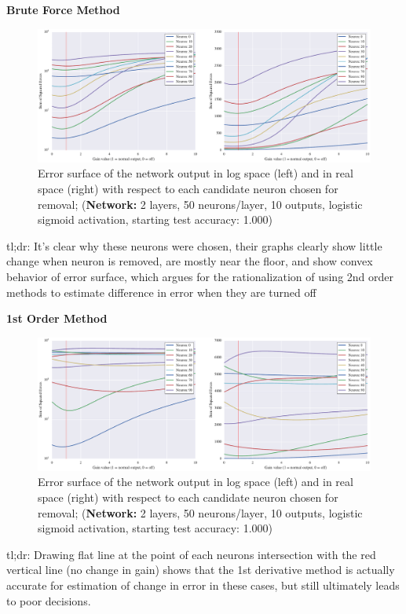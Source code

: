 \textbf{Brute Force Method}
\begin{figure}
\centering
\includegraphics[width=\linewidth]{png/mnist-deep-gt-gain.pdf}
\caption{Error surface of the network output in log space (left) and in real space (right) with respect to each candidate neuron chosen for removal; (\textbf{Network:} 2 layers, 50 neurons/layer, 10 outputs, logistic sigmoid activation, starting test accuracy: 1.000)}
\label{fig:mnist-gt-double-layer}
\end{figure}
tl;dr: It's clear why these neurons were chosen, their graphs clearly show little change when neuron is removed, are mostly near the floor, and show convex behavior of error surface, which argues for the rationalization of using 2nd order methods to estimate difference in error when they are turned off

\textbf{1st Order Method}
\begin{figure}
\centering
\includegraphics[width=\linewidth]{png/mnist-deep-g1-gain.pdf}
\caption{Error surface of the network output in log space (left) and in real space (right) with respect to each candidate neuron chosen for removal; (\textbf{Network:} 2 layers, 50 neurons/layer, 10 outputs, logistic sigmoid activation, starting test accuracy: 1.000)}
\label{fig:mnist-g1-double-layer}
\end{figure}
 tl;dr: Drawing flat line at the point of each neurons intersection with the red vertical line (no change in gain) shows that the 1st derivative method is actually accurate for estimation of change in error in these cases, but still ultimately leads to poor decisions. 

